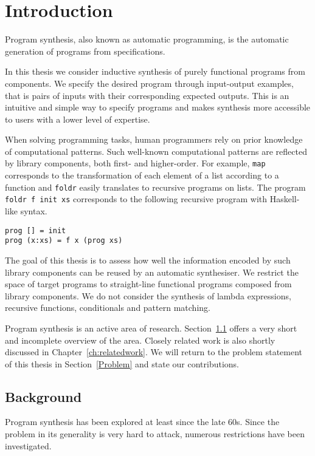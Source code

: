 \lstset{style=plain}

\chapter{Introduction}\label{ch:introduction}

Program synthesis, also known as automatic programming, is the automatic generation of programs from specifications.

In this thesis we consider inductive synthesis of purely functional programs from components. We specify the desired program through input-output examples, that is pairs of inputs with their corresponding expected outputs. This is an intuitive and simple way to specify programs and makes synthesis more accessible to users with a lower level of expertise.

When solving programming tasks, human programmers rely on prior knowledge of computational patterns. Such well-known computational patterns are reflected by library components, both first- and higher-order. For example, \lstinline!map! corresponds to the transformation of each element of a list according to a function and \lstinline!foldr! easily translates to recursive programs on lists. The program \lstinline!foldr f init xs! corresponds to the following recursive program with Haskell-like syntax.
\begin{lstlisting}[style=plain]
prog [] = init
prog (x:xs) = f x (prog xs)
\end{lstlisting}
The goal of this thesis is to assess how well the information encoded by such library components can be reused by an automatic synthesiser.
We restrict the space of target programs to straight-line functional programs composed from library components. We do not consider the synthesis of lambda expressions, recursive functions, conditionals and pattern matching.

Program synthesis is an active area of research. Section~\ref{Background} offers a very short and incomplete overview of the area. Closely related work is also shortly discussed in Chapter~\ref{ch:relatedwork}.
We will return to the problem statement of this thesis in Section~\ref{Problem} and state our contributions.

\section{Background}\label{Background}

Program synthesis has been explored at least since the late 60s. Since the problem in its generality is very hard to attack, numerous restrictions have been investigated.

